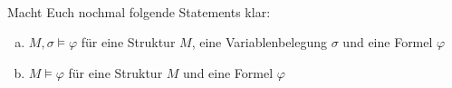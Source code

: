 \newcommand{\printpraesenzlsg}{false}
\newcommand{\printloesungen}{true}
\newcommand{\printbewertungen}{false}
\newcommand{\blattnummer}{3}



\iforiginal{}

	

\\
Macht Euch nochmal folgende Statements klar:
\begin{enumerate}[a)]
  \item $M,\sigma\models\varphi$ für eine Struktur $M$, eine Variablenbelegung $\sigma$ und eine Formel $\varphi$
  \item $M\models\varphi$ für eine Struktur $M$ und eine Formel $\varphi$
  
\end{enumerate}

